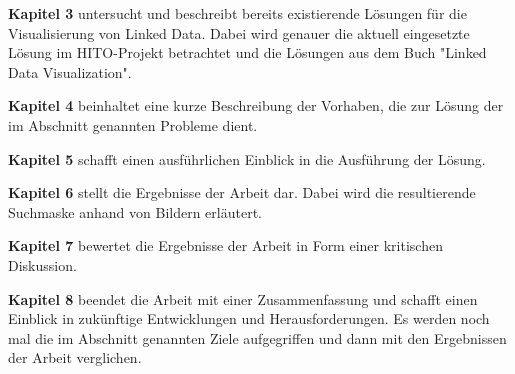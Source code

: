 \textbf{Kapitel 3} untersucht und beschreibt bereits existierende Lösungen für die Visualisierung von Linked Data. Dabei wird genauer die aktuell eingesetzte Lösung im HITO-Projekt betrachtet und die Lösungen aus dem Buch "Linked Data Visualization". \newline

\textbf{Kapitel 4} beinhaltet eine kurze Beschreibung der Vorhaben, die zur Lösung der im Abschnitt  genannten Probleme dient. \newline

\textbf{Kapitel 5} schafft einen ausführlichen Einblick in die Ausführung der Lösung.  \newline

\textbf{Kapitel 6} stellt die Ergebnisse der Arbeit dar. Dabei wird die resultierende Suchmaske anhand von Bildern erläutert. \newline

\textbf{Kapitel 7} bewertet die Ergebnisse der Arbeit in Form einer kritischen Diskussion. \newline

\textbf{Kapitel 8} beendet die Arbeit mit einer Zusammenfassung und schafft einen Einblick in zukünftige Entwicklungen und Herausforderungen. Es werden noch mal die im Abschnitt  genannten Ziele aufgegriffen und dann mit den Ergebnissen der Arbeit verglichen.



